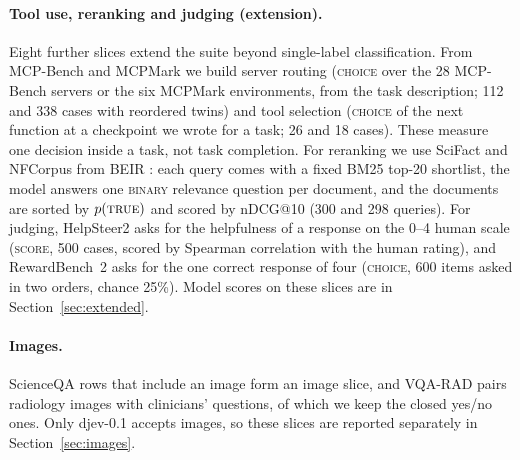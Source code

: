 \paragraph{Tool use, reranking and judging (extension).} Eight further slices
extend the suite beyond single-label classification. From MCP-Bench
\citep{wang2025mcpbench} and MCPMark \citep{wu2025mcpmark} we build server
routing (\textsc{choice} over the 28 MCP-Bench servers or the six MCPMark
environments, from the task description; 112 and 338 cases with reordered
twins) and tool selection (\textsc{choice} of the next function at a checkpoint
we wrote for a task; 26 and 18 cases). These measure one decision inside a
task, not task completion. For reranking we use SciFact
\citep{wadden2020scifact} and NFCorpus \citep{boteva2016nfcorpus} from BEIR
\citep{thakur2021beir}: each query comes with a fixed BM25 top-20 shortlist, the
model answers one \textsc{binary} relevance question per document, and the
documents are sorted by $p(\textsc{true})$ and scored by nDCG@10 (300 and 298
queries). For judging, HelpSteer2 \citep{wang2024helpsteer2} asks for the
helpfulness of a response on the 0--4 human scale (\textsc{score}, 500 cases,
scored by Spearman correlation with the human rating), and RewardBench~2
\citep{malik2025rewardbench2} asks for the one correct response of four
(\textsc{choice}, 600 items asked in two orders, chance 25\%). Model scores on
these slices are in Section~\ref{sec:extended}.

\paragraph{Images.} ScienceQA rows that include an image form an image slice, and
VQA-RAD \citep{lau2018vqarad} pairs radiology images with clinicians' questions,
of which we keep the closed yes/no ones. Only djev-0.1 accepts images, so these
slices are reported separately in Section~\ref{sec:images}.

